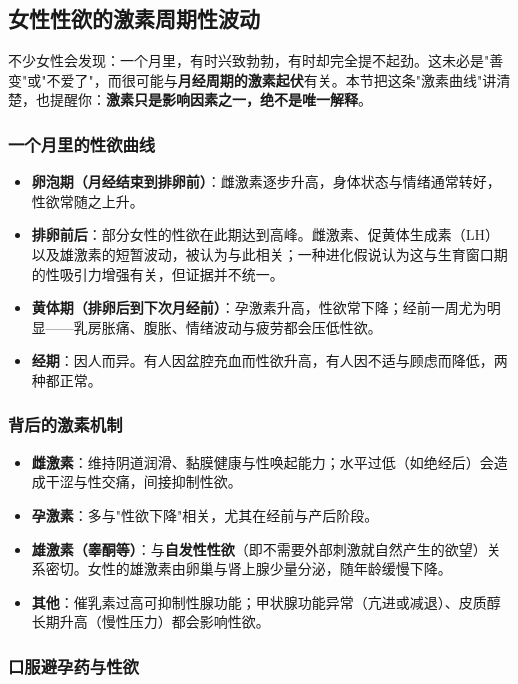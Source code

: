 \subsection{女性性欲的激素周期性波动}

不少女性会发现：一个月里，有时兴致勃勃，有时却完全提不起劲。这未必是"善变"或"不爱了"，而很可能与\textbf{月经周期的激素起伏}有关。本节把这条"激素曲线"讲清楚，也提醒你：\textbf{激素只是影响因素之一，绝不是唯一解释}。

\subsubsection{一个月里的性欲曲线}

\begin{itemize}
	\item \textbf{卵泡期（月经结束到排卵前）}：雌激素逐步升高，身体状态与情绪通常转好，性欲常随之上升。
	\item \textbf{排卵前后}：部分女性的性欲在此期达到高峰。雌激素、促黄体生成素（LH）以及雄激素的短暂波动，被认为与此相关；一种进化假说认为这与生育窗口期的性吸引力增强有关，但证据并不统一。
	\item \textbf{黄体期（排卵后到下次月经前）}：孕激素升高，性欲常下降；经前一周尤为明显——乳房胀痛、腹胀、情绪波动与疲劳都会压低性欲。
	\item \textbf{经期}：因人而异。有人因盆腔充血而性欲升高，有人因不适与顾虑而降低，两种都正常。
\end{itemize}

\subsubsection{背后的激素机制}

\begin{itemize}
	\item \textbf{雌激素}：维持阴道润滑、黏膜健康与性唤起能力；水平过低（如绝经后）会造成干涩与性交痛，间接抑制性欲。
	\item \textbf{孕激素}：多与"性欲下降"相关，尤其在经前与产后阶段。
	\item \textbf{雄激素（睾酮等）}：与\textbf{自发性性欲}（即不需要外部刺激就自然产生的欲望）关系密切。女性的雄激素由卵巢与肾上腺少量分泌，随年龄缓慢下降。
	\item \textbf{其他}：催乳素过高可抑制性腺功能；甲状腺功能异常（亢进或减退）、皮质醇长期升高（慢性压力）都会影响性欲。
\end{itemize}

\subsubsection{口服避孕药与性欲}

